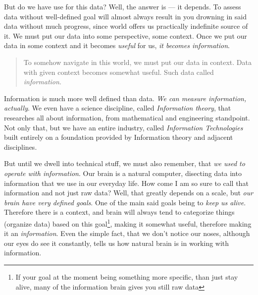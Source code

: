 \documentclass{article}
\begin{document}
            But do we have use for this data? Well, the answer is --- it depends. To assess data without well-defined goal will almost always result in you drowning in said data without much progress,
            since world offers us practically indefinite source of it. We must put our data into some perspective, some context. Once we put our data in some context and it becomes \emph{useful} for us, \emph{it becomes information}.
            
            \begin{quote}
                To somehow navigate in this world, we must put our data in context. Data with given context becomes somewhat useful. Such data called \emph{information}.
            \end{quote}

            Information is much more well defined than data. \emph{We can measure information, actually}. We even have a science discipline, called \emph{Information theory},
            that researches all about information, from mathematical and engineering standpoint. Not only that, but we have an entire industry, called \emph{Information Technologies}
            built entirely on a foundation provided by Information theory and adjacent disciplines.\par
            
            But until we dwell into technical stuff, we must also remember, that \emph{we used to operate with information}. Our brain is a natural computer, disecting data
            into information that we use in our everyday life. How come I am so sure to call that information and not just raw data? Well, that greatly depends on a 
            scale, but
            \emph{our brain have very defined goals}. One of the main said goals being to \emph{keep us alive}. Therefore there is a context, and brain will always tend to 
            categorize things (organize data) based on this goal\footnote{If your goal at the moment being something more specific, than just stay alive, many of the information brain gives you still raw data},
            making it somewhat useful, therefore making it an \emph{information}. Even the simple fact, that we don't notice our noses, although our eyes do see it constantly, 
            tells us how natural brain is in working with information. \par
            
\end{document}
